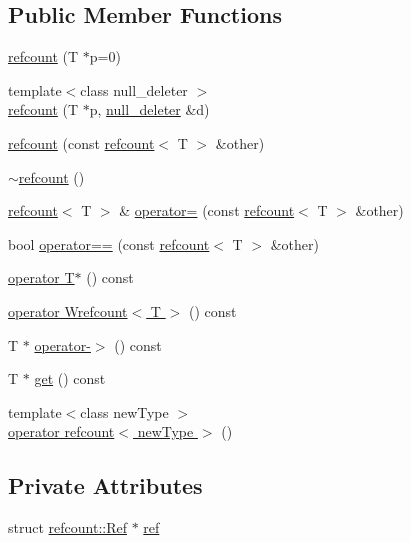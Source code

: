 \subsection*{Public Member Functions}
\begin{DoxyCompactItemize}
\item 
\hyperlink{structrefcount_aa9379f6f8bca4efb13375c07b9f37079}{refcount} (T $\ast$p=0)
\item 
{\footnotesize template$<$class null\+\_\+deleter $>$ }\\\hyperlink{structrefcount_ad40bed4dc6d3ba6609068392c7c7f290}{refcount} (T $\ast$p, \hyperlink{structnull__deleter}{null\+\_\+deleter} \&d)
\item 
\hyperlink{structrefcount_a0102e5e4ea93e25f1964a6cbfca1219b}{refcount} (const \hyperlink{structrefcount}{refcount}$<$ T $>$ \&other)
\item 
\hyperlink{structrefcount_aa4a1e2bb371224f7bbb4703e2bb137c0}{$\sim$refcount} ()
\item 
\hyperlink{structrefcount}{refcount}$<$ T $>$ \& \hyperlink{structrefcount_aa18a822e0cffd8f895ba5e774c110b6b}{operator=} (const \hyperlink{structrefcount}{refcount}$<$ T $>$ \&other)
\item 
bool \hyperlink{structrefcount_a9d655b5a498d3153b86f49e34ba80a0b}{operator==} (const \hyperlink{structrefcount}{refcount}$<$ T $>$ \&other)
\item 
\hyperlink{structrefcount_a36c77f8281dff34ee3979edabee0d833}{operator T$\ast$} () const
\item 
\hyperlink{structrefcount_ab531dc0fba2a14b8cd9b7dd368d3a300}{operator Wrefcount$<$ T $>$} () const
\item 
T $\ast$ \hyperlink{structrefcount_a84d960db3d3cd42e50255bc7acf52676}{operator-\/$>$} () const
\item 
T $\ast$ \hyperlink{structrefcount_ad8aa243007f3818b8e7a69f57b92cda0}{get} () const
\item 
{\footnotesize template$<$class new\+Type $>$ }\\\hyperlink{structrefcount_ac667e03eba9bbeeebb38eb85155c1a69}{operator refcount$<$ new\+Type $>$} ()
\end{DoxyCompactItemize}
\subsection*{Private Attributes}
\begin{DoxyCompactItemize}
\item 
struct \hyperlink{structrefcount_1_1Ref}{refcount\+::\+Ref} $\ast$ \hyperlink{structrefcount_aee0abaeb5f1d12f6088d926b52fd7334}{ref}
\end{DoxyCompactItemize}
